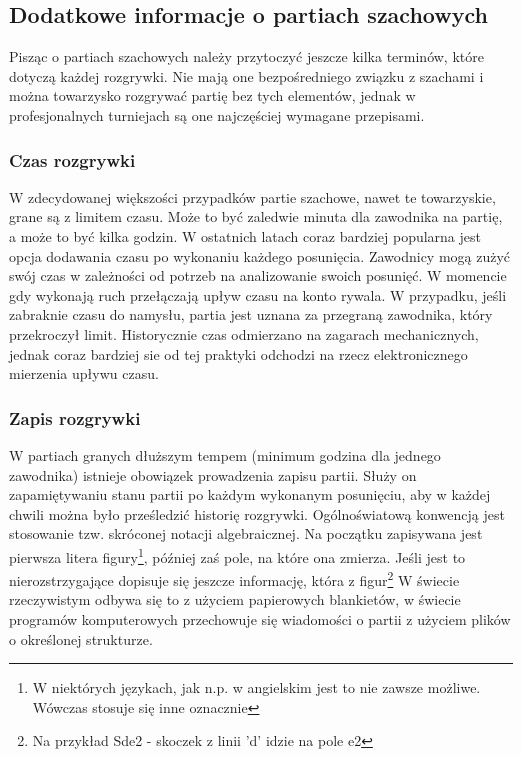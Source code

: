 \documentclass[12pt,leqno]{article}
\begin{document}
\subsection{Dodatkowe informacje o partiach szachowych}
Pisząc o partiach szachowych należy przytoczyć jeszcze kilka terminów, które dotyczą każdej rozgrywki. Nie mają one bezpośredniego związku z szachami i można towarzysko rozgrywać partię bez tych elementów, jednak w profesjonalnych turniejach są one najczęściej wymagane przepisami.
\subsubsection {Czas rozgrywki}
W zdecydowanej większości przypadków partie szachowe, nawet te towarzyskie, grane są z limitem czasu. Może to być zaledwie minuta dla zawodnika na partię, a może to być kilka godzin. W ostatnich latach coraz bardziej popularna jest opcja dodawania czasu po wykonaniu każdego posunięcia. Zawodnicy mogą zużyć swój czas w zależności od potrzeb na analizowanie swoich posunięć. W momencie gdy wykonają ruch przełączają upływ czasu na konto rywala. W przypadku, jeśli zabraknie czasu do namysłu, partia jest uznana za przegraną zawodnika, który przekroczył limit. Historycznie czas odmierzano na zagarach mechanicznych, jednak coraz bardziej sie od tej praktyki odchodzi na rzecz elektronicznego mierzenia upływu czasu.
\subsubsection{Zapis rozgrywki}
W partiach granych dłuższym tempem (minimum godzina dla jednego zawodnika) istnieje obowiązek prowadzenia zapisu partii. Służy on zapamiętywaniu stanu partii po każdym wykonanym posunięciu, aby w każdej chwili można było prześledzić historię rozgrywki. Ogólnoświatową konwencją jest stosowanie tzw. skróconej notacji algebraicznej. Na początku zapisywana jest pierwsza litera figury\footnote{W niektórych językach, jak n.p. w angielskim jest to nie zawsze możliwe. Wówczas stosuje się inne oznacznie}, później zaś pole, na które ona zmierza. Jeśli jest to nierozstrzygające dopisuje się jeszcze informację, która z figur\footnote{Na przykład Sde2 - skoczek z linii 'd' idzie na pole e2} W świecie rzeczywistym odbywa się to z użyciem papierowych blankietów, w świecie programów komputerowych przechowuje się wiadomości o partii z użyciem plików o określonej strukturze.  

\end{document}
